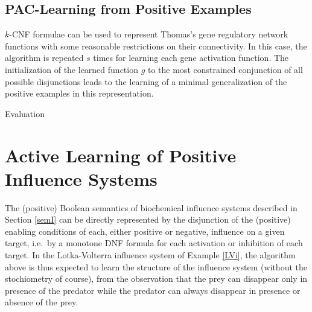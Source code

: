 \documentclass{llncs}
\begin{document}
\subsection{PAC-Learning from Positive Examples}

$k$-CNF formulae can be used to represent Thomas's gene regulatory network functions with some reasonable restrictions on their connectivity.
In this case, the algorithm is repeated $s$ times for learning each gene activation function.
The initialization of the learned function $g$ to the most constrained conjunction of all possible disjunctions
leads to the learning of a minimal generalization of the positive examples in this representation.

Evaluation

\section{Active Learning of Positive Influence Systems}

The (positive) Boolean semantics of biochemical influence systems described in Section \ref{semI}
can be directly represented by the disjunction of the (positive) enabling conditions of each, either positive or negative, influence on a given target,
i.e.~by a monotone DNF formula for each activation or inhibition of each target.
In the Lotka-Volterra influence system of Example \ref{LVi}, the algorithm above is thus expected to learn the structure of the influence system
(without the stochiometry of course),
from the observation that the prey can disappear only in presence of the predator
while the predator can always disappear in presence or absence of the prey.
\end{document}
